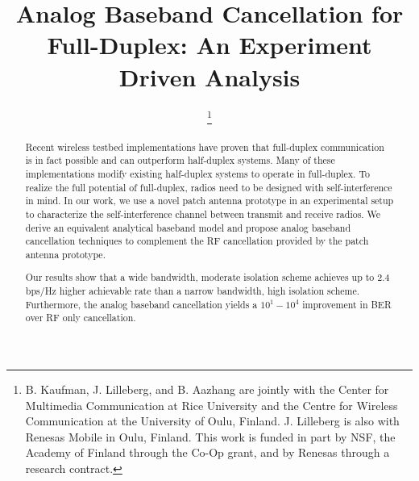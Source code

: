 \documentclass[12pt, journal,draftcls,letterpaper,onecolumn]{IEEEtran}
\begin{document}
\title{Analog Baseband Cancellation for Full-Duplex: An Experiment Driven Analysis}




\author{


\thanks{B. Kaufman, J. Lilleberg, and B. Aazhang are jointly with the Center for Multimedia Communication at Rice University and the Centre for Wireless Communication at the University of Oulu, Finland.  J. Lilleberg is also with Renesas Mobile in Oulu, Finland.  This work is funded in part by NSF, the Academy of Finland through the Co-Op grant, and by Renesas through a research contract.}}





















\maketitle

\begin{abstract}
Recent wireless testbed implementations have proven that full-duplex communication is in fact possible and can outperform half-duplex systems.  Many of these implementations modify existing half-duplex systems to operate in full-duplex.  To realize the full potential of full-duplex, radios need to be designed with self-interference in mind.  In our work, we use a novel patch antenna prototype in an experimental setup to characterize the self-interference channel between transmit and receive radios.  We derive an equivalent analytical baseband model and propose analog baseband cancellation techniques to complement the RF cancellation provided by the patch antenna prototype.   

Our results show that a wide bandwidth, moderate isolation scheme achieves up to 2.4 bps/Hz higher achievable rate than a narrow bandwidth, high isolation scheme.   Furthermore, the analog baseband cancellation yields a $10^1 - 10^4$ improvement in BER over RF only cancellation.   

\end{abstract}
\end{document}
